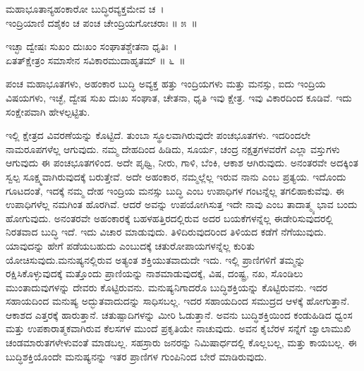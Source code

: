 \begin{shloka}
ಮಹಾಭೂತಾನ್ಯಹಂಕಾರೋ ಬುದ್ಧಿರವ್ಯಕ್ತಮೇವ ಚ~।\\ಇಂದ್ರಿಯಾಣಿ ದಶೈಕಂ ಚ ಪಂಚ ಚೇಂದ್ರಿಯಗೋಚರಾಃ \hfill॥ ೫~॥
\end{shloka}

\begin{shloka}
ಇಚ್ಛಾ ದ್ವೇಷಃ ಸುಖಂ ದುಃಖಂ ಸಂಘಾತಶ್ಚೇತನಾ ಧೃತಿಃ~।\\ಏತತ್​ಕ್ಷೇತ್ರಂ ಸಮಾಸೇನ ಸವಿಕಾರಮುದಾಹೃತಮ್ \hfill॥ ೬~॥
\end{shloka}

\begin{artha}
ಪಂಚ ಮಹಾಭೂತಗಳು, ಅಹಂಕಾರ ಬುದ್ಧಿ ಅವ್ಯಕ್ತ ಹತ್ತು ಇಂದ್ರಿಯಗಳು ಮತ್ತು ಮನಸ್ಸು, ಐದು ಇಂದ್ರಿಯ ವಿಷಯಗಳು, ಇಚ್ಛೆ, ದ್ವೇಷ ಸುಖ ದುಃಖ ಸಂಘಾತ, ಚೇತನಾ, ಧೃತಿ ಇವು ಕ್ಷೇತ್ರ. ಇವು ವಿಕಾರದಿಂದ ಕೂಡಿವೆ. ಇದು ಸಂಕ್ಷೇಪವಾಗಿ ಹೇಳಲ್ಪಟ್ಟಿತು.
\end{artha}

ಇಲ್ಲಿ ಕ್ಷೇತ್ರದ ವಿವರಣೆಯನ್ನು ಕೊಟ್ಟಿದೆ. ತುಂಬಾ ಸ್ಥೂಲವಾಗಿರುವುದೇ ಪಂಚಭೂತಗಳು. ಇದರಿಂದಲೇ ನಾಮರೂಪಗಳೆಲ್ಲ ಆಗುವುದು. ನಮ್ಮ ದೇಹದಿಂದ ಹಿಡಿದು, ಸೂರ್ಯ, ಚಂದ್ರ ನಕ್ಷತ್ರಗಳವರೆಗೆ ಎಲ್ಲಾ ವಸ್ತುಗಳು ಆಗುವುದು ಈ ಪಂಚಭೂತಗಳಿಂದ. ಅದೇ ಪೃಥ್ವಿ, ನೀರು, ಗಾಳಿ, ಬೆಂಕಿ, ಆಕಾಶ ಆಗಿರುವುದು. ಅನಂತರವೇ ಅದಕ್ಕಿಂತ ಸ್ವಲ್ಪ ಸೂಕ್ಷ್ಮವಾಗಿರುವುದಕ್ಕೆ ಬರುತ್ತೇವೆ. ಅದೇ ಅಹಂಕಾರ, ನಮ್ಮಲ್ಲೆಲ್ಲ ಇರುವ ನಾನು ಎಂಬ ಪ್ರತ್ಯಯ. ಇದೊಂದು ಗೂಟದಂತೆ, ಇದಕ್ಕೆ ನಮ್ಮ ದೇಹ ಇಂದ್ರಿಯ ಮನಸ್ಸು ಬುದ್ಧಿ ಎಂಬ ಉಪಾಧಿಗಳ ಗಂಟನ್ನೆಲ್ಲ ತಗಲಿಹಾಕುವೆವು. ಈ ಉಪಾಧಿಗಳೆಲ್ಲ ನಮಗಿಂತ ಹೊರಗಿವೆ. ಆದರೆ ಅವನ್ನು ಉಪಯೋಗಿಸುತ್ತ ಇದೇ ನಾವು ಎಂಬ ತಾದಾತ್ಮ್ಯ ಭಾವ ಬಂದು ಹೋಗುವುದು. ಅನಂತರವೇ ಅಹಂಕಾರಕ್ಕೆ ಬಹಳ\break ಹತ್ತಿರದಲ್ಲಿರುವ ಅದರ ಬಯಕೆಗಳನ್ನೆಲ್ಲ ಈಡೇರಿಸುವುದರಲ್ಲಿ ನಿರತವಾದ ಬುದ್ಧಿ ಇದೆ. ಇದು ವಿಚಾರ ಮಾಡುವುದು. ತಿಳಿದಿರುವುದರಿಂದ ತಿಳಿಯದ ಕಡೆಗೆ ನೆಗೆಯುವುದು. ಯಾವುದನ್ನು ಹೇಗೆ ಪಡೆಯಬಹುದು ಎಂಬುದಕ್ಕೆ ಚತುರೋಪಾಯಗಳನ್ನೆಲ್ಲ ಕುರಿತು ಯೋಚಿಸುವುದು.\break ಮನುಷ್ಯನಲ್ಲಿರುವ ಅತ್ಯಂತ ಶಕ್ತಿಯುತವಾದುದೇ ಇದು. ಇಲ್ಲಿ ಪ್ರಾಣಿಗಳಿಗೆ ತಮ್ಮನ್ನು ರಕ್ಷಿಸಿ\-ಕೊಳ್ಳುವುದಕ್ಕೆ ಮತ್ತೊಂದು ಪ್ರಾಣಿಯನ್ನು ನಾಶಮಾಡುವುದಕ್ಕೆ, ವಿಷ, ದಂಷ್ಟ್ರ, ನಖ, ಸೊಂಡಿಲು ಮುಂತಾದುವುಗಳನ್ನು ದೇವರು ಕೊಟ್ಟಿರುವನು. ಮನುಷ್ಯನಿಗಾದರೊ ಬುದ್ಧಿಶಕ್ತಿಯನ್ನು ಕೊಟ್ಟಿರು\-ವನು. ಇದರ ಸಹಾಯದಿಂದ ಮನುಷ್ಯ ಅದ್ಭುತವಾದುದನ್ನು ಸಾಧಿಸಬಲ್ಲ. ಇದರ ಸಹಾಯದಿಂದ ಸಮುದ್ರದ ಆಳಕ್ಕೆ ಹೋಗುತ್ತಾನೆ. ಆಕಾಶದ ಎತ್ತರಕ್ಕೆ ಹಾರುತ್ತಾನೆ. ಚತುಷ್ಪಾದಿಗಳನ್ನು ಮೀರಿ ಓಡುತ್ತಾನೆ. ಅವನು ಬುದ್ಧಿಶಕ್ತಿಯಿಂದ ಕಂಡುಹಿಡಿದ ಧ್ವಂಸ ಮತ್ತು ಉಪಕಾರಾತ್ಮಕವಾಗಿರುವ ಕೆಲಸಗಳ ಮುಂದೆ ಪ್ರಕೃತಿಯೇ ನಾಚುವುದು. ಅವನ ಕೈಬೆರಳ ಸನ್ನೆಗೆ ಜ್ವಾಲಾಮುಖಿ ಚಂಡಮಾರುತಗಳೇಳುವಂತೆ ಮಾಡಬಲ್ಲ. ಸಹಸ್ರಾರು ಜನರನ್ನು ನಿಮಿಷಾರ್ಧದಲ್ಲಿ ಕೊಲ್ಲಬಲ್ಲ, ಮತ್ತು ಕಾಯಬಲ್ಲ. ಈ ಬುದ್ಧಿಶಕ್ತಿಯೊಂದೇ ಮನುಷ್ಯನನ್ನು ಇತರ ಪ್ರಾಣಿಗಳ ಗುಂಪಿನಿಂದ ಬೇರೆ ಮಾಡಿರುವುದು.\enginline{}

